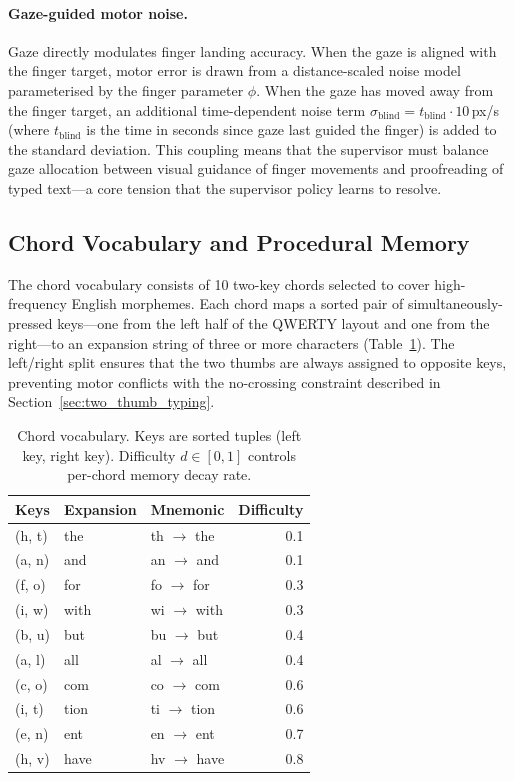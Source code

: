\documentclass[sigconf,review,anonymous]{acmart}
\begin{document}
\paragraph{Gaze-guided motor noise.}
Gaze directly modulates finger landing accuracy. When the gaze is aligned with the finger target, motor error is drawn from a distance-scaled noise model parameterised by the finger parameter $\phi$. When the gaze has moved away from the finger target, an additional time-dependent noise term $\sigma_{\mathrm{blind}} = t_{\mathrm{blind}} \cdot 10$\,px/s (where $t_{\mathrm{blind}}$ is the time in seconds since gaze last guided the finger) is added to the standard deviation. This coupling means that the supervisor must balance gaze allocation between visual guidance of finger movements and proofreading of typed text—a core tension that the supervisor policy learns to resolve.

\subsection{Chord Vocabulary and Procedural Memory}
\label{sec:chord_memory}

The chord vocabulary consists of 10 two-key chords selected to cover
high-frequency English morphemes.  Each chord maps a sorted pair of
simultaneously-pressed keys—one from the left half of the QWERTY layout
and one from the right—to an expansion string of three or more characters
(Table~\ref{tab:chord_vocab}).  The left/right split ensures that the two
thumbs are always assigned to opposite keys, preventing motor conflicts
with the no-crossing constraint described in
Section~\ref{sec:two_thumb_typing}.

\begin{table}[h]
\centering
\caption{Chord vocabulary.  Keys are sorted tuples (left key, right key).
Difficulty $d \in [0,1]$ controls per-chord memory decay rate.}
\label{tab:chord_vocab}
\begin{tabular}{lllr}
\toprule
Keys & Expansion & Mnemonic & Difficulty \\
\midrule
(h, t) & the  & th $\to$ the  & 0.1 \\
(a, n) & and  & an $\to$ and  & 0.1 \\
(f, o) & for  & fo $\to$ for  & 0.3 \\
(i, w) & with & wi $\to$ with & 0.3 \\
(b, u) & but  & bu $\to$ but  & 0.4 \\
(a, l) & all  & al $\to$ all  & 0.4 \\
(c, o) & com  & co $\to$ com  & 0.6 \\
(i, t) & tion & ti $\to$ tion & 0.6 \\
(e, n) & ent  & en $\to$ ent  & 0.7 \\
(h, v) & have & hv $\to$ have & 0.8 \\
\bottomrule
\end{tabular}
\end{table}
\end{document}
